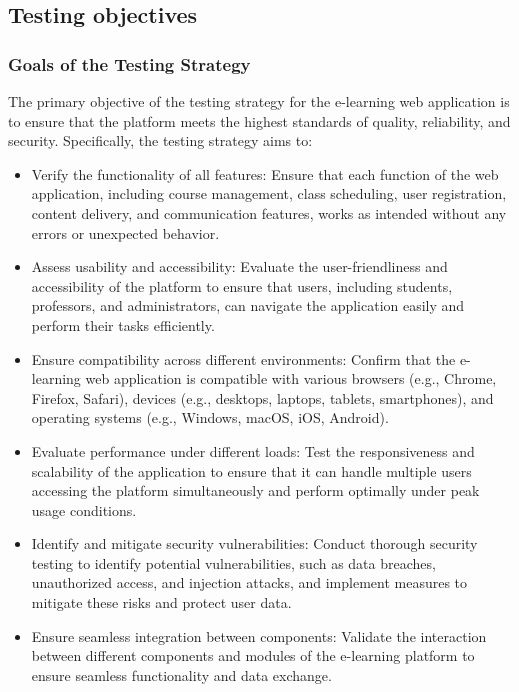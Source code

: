 		
		
	\subsection{Testing objectives}
	
		\subsubsection{Goals of the Testing Strategy}
		
		The primary objective of the testing strategy for the e-learning web application is to ensure that the platform meets the highest standards of quality, reliability, and security. Specifically, the testing strategy aims to:
		
		\begin{itemize}
			\item Verify the functionality of all features: Ensure that each function of the web application, including course management, class scheduling, user registration, content delivery, and communication features, works as intended without any errors or unexpected behavior.
			\item Assess usability and accessibility: Evaluate the user-friendliness and accessibility of the platform to ensure that users, including students, professors, and administrators, can navigate the application easily and perform their tasks efficiently.
			\item Ensure compatibility across different environments: Confirm that the e-learning web application is compatible with various browsers (e.g., Chrome, Firefox, Safari), devices (e.g., desktops, laptops, tablets, smartphones), and operating systems (e.g., Windows, macOS, iOS, Android).
			\item Evaluate performance under different loads: Test the responsiveness and scalability of the application to ensure that it can handle multiple users accessing the platform simultaneously and perform optimally under peak usage conditions.
			\item Identify and mitigate security vulnerabilities: Conduct thorough security testing to identify potential vulnerabilities, such as data breaches, unauthorized access, and injection attacks, and implement measures to mitigate these risks and protect user data.
			\item Ensure seamless integration between components: Validate the interaction between different components and modules of the e-learning platform to ensure seamless functionality and data exchange.
		\end{itemize}
		
